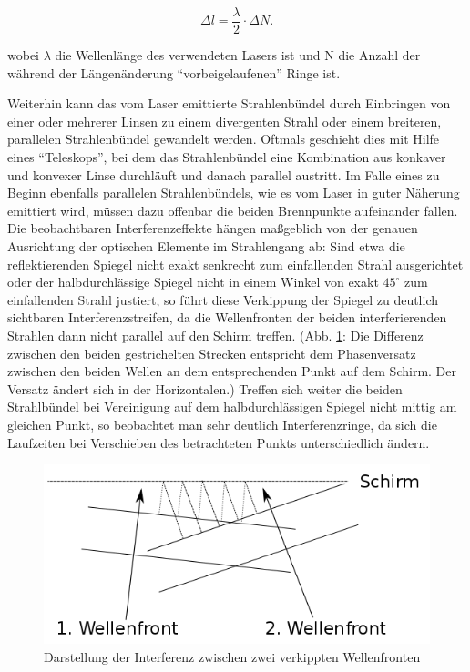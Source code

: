 \begin{equation}
\Delta l = \frac{\lambda}{2} \cdot \Delta N. 
\end{equation}


wobei $ \lambda $ die Wellenlänge des verwendeten Lasers ist und N die Anzahl der während der Längenänderung \enquote{vorbeigelaufenen} Ringe ist. 



Weiterhin kann das vom Laser emittierte Strahlenbündel durch Einbringen von einer oder mehrerer Linsen zu einem divergenten Strahl oder einem breiteren, parallelen Strahlenbündel gewandelt werden. Oftmals geschieht dies mit Hilfe eines \enquote{Teleskops}, bei dem das Strahlenbündel eine Kombination aus konkaver und konvexer Linse durchläuft und danach parallel austritt. Im Falle eines zu Beginn ebenfalls parallelen Strahlenbündels, wie es vom Laser in guter Näherung emittiert wird, müssen dazu offenbar die beiden Brennpunkte aufeinander fallen.  \\

Die beobachtbaren Interferenzeffekte hängen maßgeblich von der genauen Ausrichtung der optischen Elemente im Strahlengang ab: 
Sind etwa die reflektierenden Spiegel nicht exakt senkrecht zum einfallenden Strahl ausgerichtet oder der halbdurchlässige Spiegel nicht in einem Winkel von exakt $ 45 ^\circ$  zum einfallenden Strahl justiert, so führt diese Verkippung der Spiegel zu deutlich sichtbaren Interferenzstreifen, da die Wellenfronten der beiden interferierenden Strahlen dann nicht parallel auf den Schirm treffen. (Abb. \ref{verkippung}: Die Differenz zwischen den beiden gestrichelten Strecken entspricht dem Phasenversatz zwischen den beiden Wellen an dem entsprechenden Punkt auf dem Schirm. Der Versatz ändert sich in der Horizontalen.) Treffen sich weiter die beiden Strahlbündel bei Vereinigung auf dem halbdurchlässigen Spiegel nicht mittig am gleichen Punkt, so beobachtet man sehr deutlich Interferenzringe, da sich die Laufzeiten bei Verschieben des betrachteten Punkts unterschiedlich ändern. 

\begin{figure}
\centering
        \includegraphics[width=.9\textwidth]{images/verkippung.png}
\caption{Darstellung der Interferenz zwischen zwei verkippten Wellenfronten}
\label{verkippung}
\end{figure}


